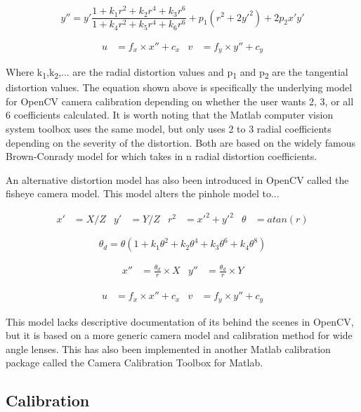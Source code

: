 \documentclass{article}
\begin{document}
\[
y'' = y' \frac{1+k_1r^2+k_2r^4+k_3r^6}{1+k_4r^2+k_5r^4+k_6r^6} + p_1(r^2+2y'^2) + 2p_2x'y'
\]

\begin{align*}
u &= f_x \times x'' + c_x & v&=f_y \times y'' + c_y
\end{align*}

Where k\textsubscript{1},k\textsubscript{2},... are the radial distortion values and p\textsubscript{1} and p\textsubscript{2} are the tangential distortion values. The equation shown above is specifically the underlying model for OpenCV camera calibration depending on whether the user wants 2, 3, or all 6 coefficients calculated. It is worth noting that the Matlab computer vision system toolbox uses the same model, but only uses 2 to 3 radial coefficients depending on the severity of the distortion. Both are based on the widely famous Brown-Conrady model for which takes in n radial distortion coefficients. 

An alternative distortion model has also been introduced in OpenCV called the fisheye camera model. This model alters the pinhole model to...

\begin{align*}
x'&= X/Z & y'&= Y/Z & r^2 &= x'^2 + y'^2 & \theta &= atan(r)
\end{align*}

\[
\theta_d = \theta(1+k_1\theta^2+k_2\theta^4+k_3\theta^6+k_4\theta^8)
\]

\begin{align*}
x'' &= \frac{\theta_d}{r} \times X & y'' &= \frac{\theta_d}{r} \times Y
\end{align*}

\begin{align*}
u &= f_x \times x'' + c_x & v&=f_y \times y'' + c_y
\end{align*}

This model lacks descriptive documentation of its behind the scenes in OpenCV, but it is based on a more generic camera model and calibration method for wide angle lenses. This has also been  implemented in another Matlab calibration package called the Camera Calibration Toolbox for Matlab.

\subsection{Calibration}
\end{document}
